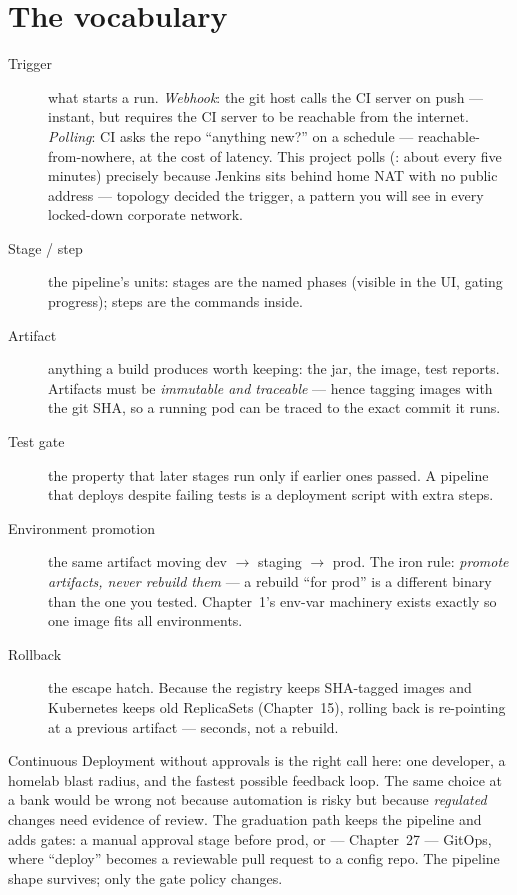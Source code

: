 \section{The vocabulary}

\begin{description}
  \item[Trigger] what starts a run. \emph{Webhook}: the git host calls
  the CI server on push --- instant, but requires the CI server to be
  reachable from the internet. \emph{Polling}: CI asks the repo ``anything
  new?'' on a schedule --- reachable-from-nowhere, at the cost of
  latency. This project polls (: about every five
  minutes) precisely because Jenkins sits behind home NAT with no
  public address --- topology decided the trigger, a pattern you will
  see in every locked-down corporate network.
  \item[Stage / step] the pipeline's units: stages are the named phases
  (visible in the UI, gating progress); steps are the commands inside.
  \item[Artifact] anything a build produces worth keeping: the jar, the
  image, test reports. Artifacts must be \emph{immutable and traceable}
  --- hence tagging images with the git SHA, so a running pod can be
  traced to the exact commit it runs.
  \item[Test gate] the property that later stages run only if earlier
  ones passed. A pipeline that deploys despite failing tests is a
  deployment script with extra steps.
  \item[Environment promotion] the same artifact moving dev
  $\rightarrow$ staging $\rightarrow$ prod. The iron rule:
  \emph{promote artifacts, never rebuild them} --- a rebuild ``for
  prod'' is a different binary than the one you tested. Chapter~1's
  env-var machinery exists exactly so one image fits all environments.
  \item[Rollback] the escape hatch. Because the registry keeps
  SHA-tagged images and Kubernetes keeps old ReplicaSets
  (Chapter~15), rolling back is re-pointing at a previous artifact ---
  seconds, not a rebuild.
\end{description}

\begin{decision}
Continuous Deployment without approvals is the right call here: one
developer, a homelab blast radius, and the fastest possible feedback
loop. The same choice at a bank would be wrong not because automation
is risky but because \emph{regulated} changes need evidence of review.
The graduation path keeps the pipeline and adds gates: a manual
approval stage before prod, or --- Chapter~27 --- GitOps, where
``deploy'' becomes a reviewable pull request to a config repo. The
pipeline shape survives; only the gate policy changes.
\end{decision}


